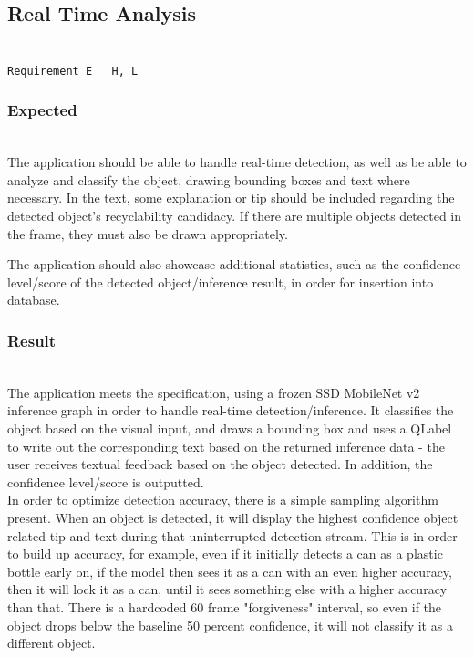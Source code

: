 \documentclass[conference]{IEEEtran}
\begin{document}
\subsection{Real Time Analysis}~\\
\texttt{Requirement E ~ H, L}~\\
\subsubsection{Expected}~\\
The application should be able to handle real-time detection, as well as be able to analyze and classify the object, drawing bounding boxes and text where necessary. In the text, some explanation or tip should be included regarding the detected object's recyclability candidacy. If there are multiple objects detected in the frame, they must also be drawn appropriately.

The application should also showcase additional statistics, such as the confidence level/score of the detected object/inference result, in order for insertion into database.~\\

\subsubsection{Result}~\\
The application meets the specification, using a frozen SSD MobileNet v2 inference graph in order to handle real-time detection/inference. It classifies the object based on the visual input, and draws a bounding box and uses a QLabel to write out the corresponding text based on the returned inference data - the user receives textual feedback based on the object detected. In addition, the confidence level/score is outputted.\\

In order to optimize detection accuracy, there is a simple sampling algorithm present. When an object is detected, it will display the highest confidence object related tip and text during that uninterrupted detection stream. This is in order to build up accuracy, for example, even if it initially detects a can as a plastic bottle early on, if the model then sees it as a can with an even higher accuracy, then it will lock it as a can, until it sees something else with a higher accuracy than that. There is a hardcoded 60 frame "forgiveness" interval, so even if the object drops below the baseline 50 percent confidence, it will not classify it as a different object. \\
\end{document}
